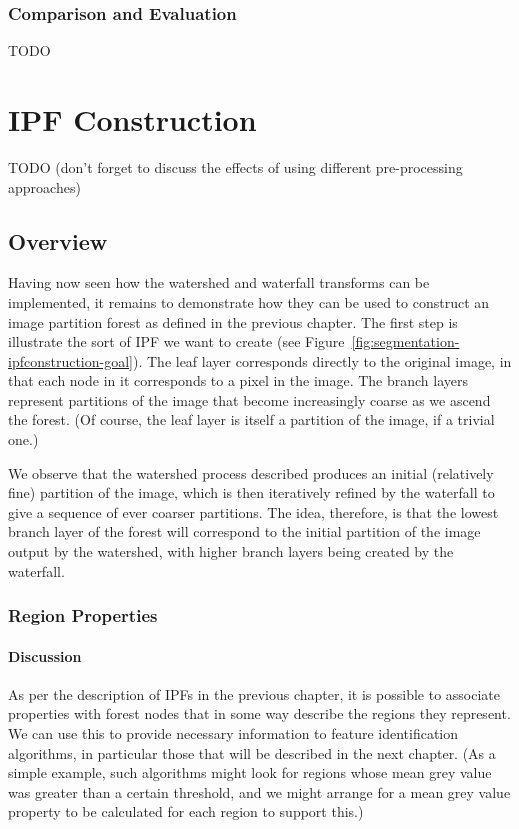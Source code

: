 \subsubsection{Comparison and Evaluation}

TODO

\section{IPF Construction}
\label{sec:segmentation-ipfconstruction}

TODO (don't forget to discuss the effects of using different pre-processing approaches)

\subsection{Overview}

Having now seen how the watershed and waterfall transforms can be implemented, it remains to demonstrate how they can be used to construct an image partition forest as defined in the previous chapter. The first step is illustrate the sort of IPF we want to create (see Figure~\ref{fig:segmentation-ipfconstruction-goal}). The leaf layer corresponds directly to the original image, in that each node in it corresponds to a pixel in the image. The branch layers represent partitions of the image that become increasingly coarse as we ascend the forest. (Of course, the leaf layer is itself a partition of the image, if a trivial one.)


We observe that the watershed process described produces an initial (relatively fine) partition of the image, which is then iteratively refined by the waterfall to give a sequence of ever coarser partitions. The idea, therefore, is that the lowest branch layer of the forest will correspond to the initial partition of the image output by the watershed, with higher branch layers being created by the waterfall.

\subsubsection{Region Properties}

\paragraph{Discussion}

As per the description of IPFs in the previous chapter, it is possible to associate properties with forest nodes that in some way describe the regions they represent. We can use this to provide necessary information to feature identification algorithms, in particular those that will be described in the next chapter. (As a simple example, such algorithms might look for regions whose mean grey value was greater than a certain threshold, and we might arrange for a mean grey value property to be calculated for each region to support this.)


